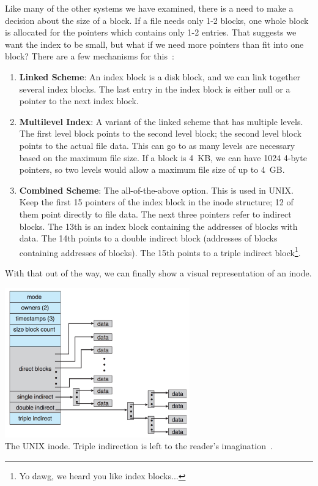 Like many of the other systems we have examined, there is a need to make a decision about the size of a block. If a file needs only 1-2 blocks, one whole block is allocated for the pointers which contains only 1-2 entries. That suggests we want the index to be small, but what if we need more pointers than fit into one block? There are a few mechanisms for this~\cite{osc}:

\begin{enumerate}
	\item \textbf{Linked Scheme}: An index block is a disk block, and we can link together several index blocks. The last entry in the index block is either null or a pointer to the next index block.
	\item \textbf{Multilevel Index}: A variant of the linked scheme that has multiple levels. The first level block points to the second level block; the second level block points to the actual file data. This can go to as many levels are necessary based on the maximum file size. If a block is 4~KB, we can have 1024 4-byte pointers, so two levels would allow a maximum file size of up to 4~GB.
	\item \textbf{Combined Scheme}: The all-of-the-above option. This is used in UNIX. Keep the first 15 pointers of the index block in the inode structure; 12 of them point directly to file data. The next three pointers refer to indirect blocks. The 13th is an index block containing the addresses of blocks with data. The 14th points to a double indirect block (addresses of blocks containing addresses of blocks). The 15th points to a triple indirect block\footnote{Yo dawg, we heard you like index blocks...}.
\end{enumerate}

With that out of the way, we can finally show a visual representation of an inode.

\begin{center}
	\includegraphics[width=0.6\textwidth]{images/unix-inode.png}\\
	The UNIX inode. Triple indirection is left to the reader's imagination~\cite{osc}.
\end{center}

